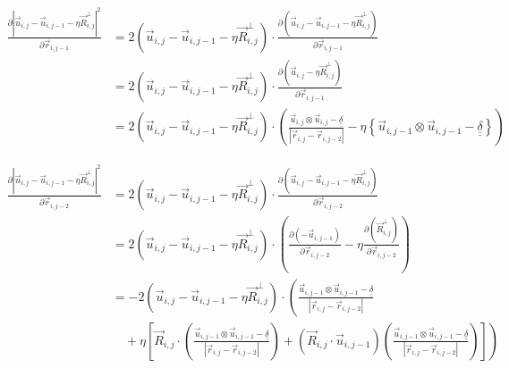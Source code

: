 \documentclass{article}
\renewcommand{\ij}{_{i,j}}
\newcommand{\ijj}{_{i,j-1}}
\newcommand{\ijjj}{_{i,j-2}}
\newcommand{\magn}[1]{\left\vert #1 \right\vert }
\renewcommand{\part}[2]{\frac{\partial #1 }{\partial #2}}
\newcommand{\ten}[1]{\underline{\underline{#1}}}
\newcommand{\rij}{\vec{r} \ij}
\newcommand{\Rij}{\vec{R} \ij}
\newcommand{\rijj}{\vec{r} \ijj}
\newcommand{\rijjj}{\vec{r} \ijjj}
\newcommand{\uij}{\vec{u} \ij}
\newcommand{\uijj}{\vec{u} \ijj}
\begin{document}
\begin{align*}
  \part{\magn{\uij - \uijj - \eta \Rij^\perp}^2 }{
    \rijj
  }
  &=
  2\left(\uij - \uijj - \eta \Rij^\perp\right) \cdot
  \part{\left(\uij - \uijj - \eta \Rij^\perp\right)}{\rijj}
  \\
  &=
  2\left(\uij - \uijj - \eta \Rij^\perp\right) \cdot
  \part{\left(\uij - \eta \Rij^\perp\right)}{\rijj} 
  \\
  &=
  2\left(\uij - \uijj - \eta \Rij^\perp\right) \cdot
  \left(
  \frac{\uij \otimes \uij - \ten{\delta} }{\magn{\rij - \rijjj}}
  -
  \eta 
  \left\{
  \uijj \otimes \uijj 
  -
  \ten{\delta} 
  \right\}
  \right)
\end{align*}


\begin{align*}
  \part{\magn{\uij - \uijj - \eta \Rij^\perp}^2 }{
    \rijjj
  }
  &=
  2\left(\uij - \uijj - \eta \Rij^\perp\right) \cdot
  \part{\left(\uij - \uijj - \eta \Rij^\perp\right)}{\rijjj}
  \\
  & =
  2\left(\uij - \uijj - \eta \Rij^\perp\right) \cdot
  \left(
  \part{ \left( - \uijj \right) }{\rijjj}
  -
  \eta 
  \part{\left( \Rij^\perp\right)}{\rijjj}
  \right)
  \\
  & =
  - 2\left(\uij - \uijj - \eta \Rij^\perp\right) 
  \cdot
  \left(
  \frac{\uijj \otimes \uijj - \ten{\delta} }{\magn{\rij - \rijjj}}
  \right. 
  \\
  &
  \quad 
  +
  \eta 
  \left.
  \left[
  \Rij \cdot 
  \left(
    \frac{\uijj \otimes \uijj - \ten{\delta}}{\magn{\rij - \rijjj}}
  \right)
  + 
  \left(
  \vec{R}\ij \cdot \vec{u} \ijj
  \right)
  {
  \left(
  \frac{\uijj \otimes \uijj - \ten{\delta} }{\magn{\rij - \rijjj}}
  \right)
  }
  \right]
  \right)
\end{align*}
\end{document}
